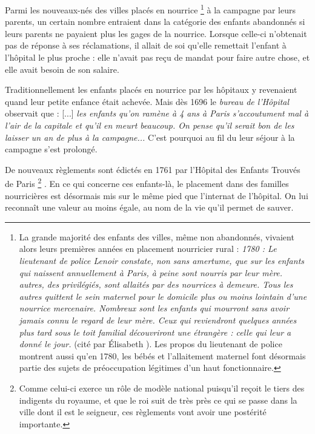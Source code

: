  Parmi les nouveaux-nés des villes placés en nourrice%
\footnote{La grande majorité des enfants des villes, même non abandonnés, vivaient alors leurs premières années en placement nourricier rural : \emph{1780 : Le lieutenant de police Lenoir constate, non sans amertume, que sur les  enfants qui naissent annuellement à Paris,  à peine sont nourris par leur mère.  autres, des privilégiés, sont allaités par des nourrices à demeure. Tous les autres quittent le sein maternel pour le domicile plus ou moins lointain d'une nourrice mercenaire. Nombreux sont les enfants qui mourront sans avoir jamais connu le regard de leur mère. Ceux qui reviendront quelques années plus tard sous le toit familial découvriront une étrangère : celle qui leur a donné le jour.} (cité par Élisabeth ). Les propos du lieutenant de police montrent aussi qu'en 1780, les bébés et l'allaitement maternel font désormais partie des sujets de préoccupation légitimes d'un haut fonctionnaire.} 
à la campagne par leurs parents, un certain nombre entraient dans la catégorie des enfants abandonnés si leurs parents ne payaient plus les gages de la nourrice. Lorsque celle-ci n'obtenait pas de réponse à ses réclamations, il allait de soi qu'elle remettait l'enfant à l'hôpital le plus proche : elle n'avait pas reçu de mandat pour faire autre chose, et elle avait besoin de son salaire. 




 Traditionnellement les enfants placés en nourrice par les hôpitaux y revenaient quand leur petite enfance était achevée. Mais dès 1696 le \emph{bureau de l'Hôpital} observait que : [...] \emph{les enfants qu'on ramène à 4 ans à Paris s'accoutument mal à l'air de la capitale et qu'il en meurt beaucoup. On pense qu'il serait bon de les laisser un an de plus à la campagne...} C'est pourquoi au fil du  leur séjour à la campagne s'est prolongé.

 De nouveaux règlements sont édictés en 1761 par l'Hôpital des Enfants Trouvés de Paris%
\footnote{Comme celui-ci exerce un rôle de modèle national puisqu'il reçoit le tiers des indigents du royaume, et que le roi suit de très près ce qui se passe dans la ville dont il est le seigneur, ces règlements vont avoir une postérité importante.}%
. En ce qui concerne ces enfants-là, le placement dans des familles nourricières est désormais mis sur le même pied que l'internat de l'hôpital. On lui reconnaît une valeur au moins égale, au nom de la vie qu'il permet de sauver. 

